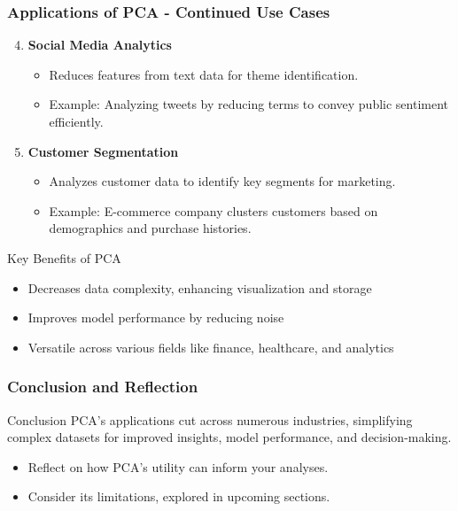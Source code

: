 \documentclass[aspectratio=169]{beamer}
\begin{document}
\begin{frame}[fragile]
    \frametitle{Applications of PCA - Continued Use Cases}
    \begin{enumerate}
        \setcounter{enumi}{3}
        \item \textbf{Social Media Analytics}
        \begin{itemize}
            \item Reduces features from text data for theme identification.
            \item Example: Analyzing tweets by reducing terms to convey public sentiment efficiently.
        \end{itemize}
        
        \item \textbf{Customer Segmentation}
        \begin{itemize}
            \item Analyzes customer data to identify key segments for marketing.
            \item Example: E-commerce company clusters customers based on demographics and purchase histories.
        \end{itemize}
    \end{enumerate}
    
    \begin{block}{Key Benefits of PCA}
        \begin{itemize}
            \item Decreases data complexity, enhancing visualization and storage
            \item Improves model performance by reducing noise
            \item Versatile across various fields like finance, healthcare, and analytics
        \end{itemize}
    \end{block}
\end{frame}

\begin{frame}[fragile]
    \frametitle{Conclusion and Reflection}
    \begin{block}{Conclusion}
        PCA's applications cut across numerous industries, simplifying complex datasets for improved insights, model performance, and decision-making.
    \end{block}
    \begin{itemize}
        \item Reflect on how PCA's utility can inform your analyses.
        \item Consider its limitations, explored in upcoming sections.
    \end{itemize}
\end{frame}
\end{document}
